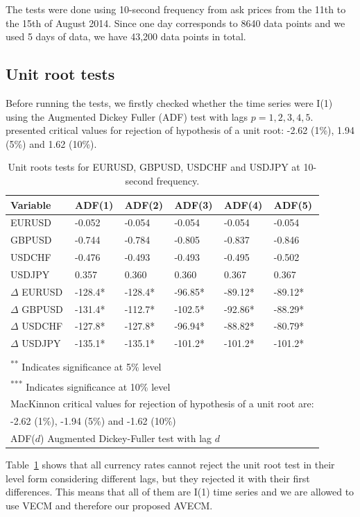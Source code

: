 The tests were done using 10-second frequency from ask prices from the 11th to
the 15th of August 2014. Since one day corresponds to 8640 data points and we
used 5 days of data, we have 43,200 data points in total.

\subsection{Unit root tests} \label{sec:unitroottests}

Before running the tests, we firstly checked whether the time series were I(1)
using the Augmented Dickey Fuller (ADF) test with lags $p=1,2,3,4,5$.
\cite{mackinnon2010} presented critical values for rejection of hypothesis of a
unit root: -2.62 (1\%), 1.94 (5\%) and 1.62 (10\%).
\begin{table}[ht]
\label{tab:adf}
\centering
\begin{tabular}{llllll}
\toprule
{Variable} & {ADF(1)} & {ADF(2)} & {ADF(3)} & {ADF(4)} & {ADF(5)}\\ 
\midrule
EURUSD &  -0.052   & -0.054  & -0.054  & -0.054  & -0.054  \\
GBPUSD &  -0.744  & -0.784  & -0.805  & -0.837  & -0.846  \\
USDCHF &  -0.476   & -0.493  & -0.493  & -0.495  & -0.502  \\
USDJPY &  0.357   & 0.360  & 0.360  & 0.367  & 0.367  \\
$\Delta$ EURUSD & -128.4*  & -128.4*  & -96.85* & -89.12*   & -89.12*\\
$\Delta$ GBPUSD & -131.4*  & -112.7*  & -102.5* & -92.86*   & -88.29*\\
$\Delta$ USDCHF & -127.8*  & -127.8*  & -96.94* & -88.82*   & -80.79*\\
$\Delta$ USDJPY & -135.1*  & -135.1*  & -101.2* & -101.2*   & -101.2*\\
\bottomrule
\addlinespace[1ex]
\multicolumn{6}{l}{ \textsuperscript{*} Indicates significance at 1\% level} \\
\multicolumn{6}{l}{ \textsuperscript{**} Indicates significance at 5\% level} \\
\multicolumn{6}{l}{ \textsuperscript{***} Indicates significance at 10\% level} \\
\multicolumn{6}{l}{MacKinnon critical values for rejection of hypothesis of a unit root are:}\\
\multicolumn{6}{l}{ -2.62 (1\%), -1.94 (5\%) and -1.62 (10\%)}\\
\multicolumn{6}{l}{ADF($d$) Augmented Dickey-Fuller test with lag $d$} 
\end{tabular}
\caption{Unit roots tests for EURUSD, GBPUSD, USDCHF and USDJPY at 10-second
frequency.}
\end{table}
Table~\ref{tab:adf} shows that all currency rates cannot reject the unit root
test in their level form considering different lags, but they rejected it with
their first differences. This means that all of them are I(1) time series and we
are allowed to use VECM and therefore our proposed AVECM.

